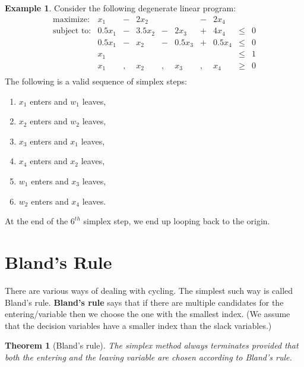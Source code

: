 \documentclass[
]{book}
\providecommand{\tightlist}{%
  \setlength{\itemsep}{0pt}\setlength{\parskip}{0pt}}
\newtheorem{theorem}{Theorem}[chapter]
\theoremstyle{definition}
\theoremstyle{definition}
\newtheorem{example}{Example}[chapter]
\theoremstyle{definition}
\theoremstyle{definition}
\theoremstyle{remark}
\begin{document}
\begin{example}
\protect\hypertarget{exm:cycling}{}\label{exm:cycling}Consider the following degenerate linear program:
\begin{equation*}
  \begin{array}{rrrrrrrrrl}
  \mbox{maximize:} & x_1 & - & 2x_2 & & & - & 2x_4 \\
  \mbox{subject to:}
    & 0.5 x_1 & - & 3.5x_2 & - & 2x_3 & + & 4 x_4 & \le & 0 \\
    & 0.5 x_1 & - & x_2 & - & 0.5 x_3 & + & 0.5 x_4 & \le & 0 \\
    & x_1 & & & & &  &  & \le & 1 \\
    & x_1 & , & x_2 & , & x_3 & , & x_4 & \ge & 0 \\
  \end{array}
\end{equation*}
The following is a valid sequence of simplex steps:

\begin{enumerate}
\def\labelenumi{\arabic{enumi}.}
\tightlist
\item
  \(x_1\) enters and \(w_1\) leaves,
\item
  \(x_2\) enters and \(w_2\) leaves,
\item
  \(x_3\) enters and \(x_1\) leaves,
\item
  \(x_4\) enters and \(x_2\) leaves,
\item
  \(w_1\) enters and \(x_3\) leaves,
\item
  \(w_2\) enters and \(x_4\) leaves.
\end{enumerate}

At the end of the \(6^{th}\) simplex step, we end up looping back to the origin.
\end{example}

\hypertarget{blands-rule}{%
\section{Bland's Rule}\label{blands-rule}}

There are various ways of dealing with cycling.
The simplest such way is called Bland's rule.
\textbf{Bland's rule} says that if there are multiple candidates for the entering/variable then we choose the one with the smallest index. (We assume that the decision variables have a smaller index than the slack variables.)

\begin{theorem}[Bland's rule]
The simplex method always terminates provided that both the
entering and the leaving variable are chosen according to Bland's rule.
\end{theorem}
\end{document}
